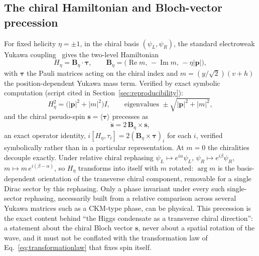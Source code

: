\documentclass[11pt,a4paper]{article}
\begin{document}
\subsection{The chiral Hamiltonian and Bloch-vector precession}
\label{sec:chiralhamiltonian}

For fixed helicity $\eta = \pm 1$, in the chiral basis $(\psi_L, \psi_R)$, the standard electroweak
Yukawa coupling~\cite{Weinberg1967, Higgs1964} gives the two-level Hamiltonian
\begin{equation}
H_\eta = \mathbf{B}_\eta \cdot \boldsymbol{\tau}, \qquad
\mathbf{B}_\eta = \bigl(\operatorname{Re} m,\, -\operatorname{Im} m,\, -\eta |\mathbf{p}|\bigr),
\label{eq:chiralham}
\end{equation}
with $\boldsymbol{\tau}$ the Pauli matrices acting on the chiral index and
$m = (y/\sqrt2)(v + h)$ the position-dependent Yukawa mass term.
Verified by exact symbolic computation (script cited in Section~\ref{sec:reproducibility}):
\begin{equation}
H_\eta^2 = \bigl(|\mathbf{p}|^2 + |m|^2\bigr) I, \qquad
\text{eigenvalues } \pm\sqrt{|\mathbf{p}|^2 + |m|^2},
\label{eq:chiralspectrum}
\end{equation}
and the chiral pseudo-spin $\mathbf{s} = \langle \boldsymbol{\tau} \rangle$ precesses as
\begin{equation}
\dot{\mathbf{s}} = 2\, \mathbf{B}_\eta \times \mathbf{s},
\label{eq:chiralprecession}
\end{equation}
an exact operator identity, $i[H_\eta, \tau_i] = 2 (\mathbf{B}_\eta \times \boldsymbol{\tau})_i$ for
each $i$, verified symbolically rather than in a particular representation.
At $m = 0$ the chiralities decouple exactly.
Under relative chiral rephasing $\psi_L \mapsto e^{i\alpha} \psi_L$, $\psi_R \mapsto e^{i\beta} \psi_R$,
$m \mapsto m\, e^{i(\beta - \alpha)}$, so $H_\eta$ transforms into itself with $m$ rotated: $\arg m$ is
the basis-dependent orientation of the transverse chiral component, removable for a single Dirac
sector by this rephasing.
Only a phase invariant under every such single-sector rephasing, necessarily built from a relative
comparison across several Yukawa matrices such as a CKM-type phase, can be physical.
This precession is the exact content behind ``the Higgs condensate as a transverse chiral
direction'': a statement about the chiral Bloch vector $\mathbf{s}$, never about a spatial rotation
of the wave, and it must not be conflated with the transformation law of
Eq.~\eqref{eq:transformationlaw} that fixes spin itself.
\end{document}
